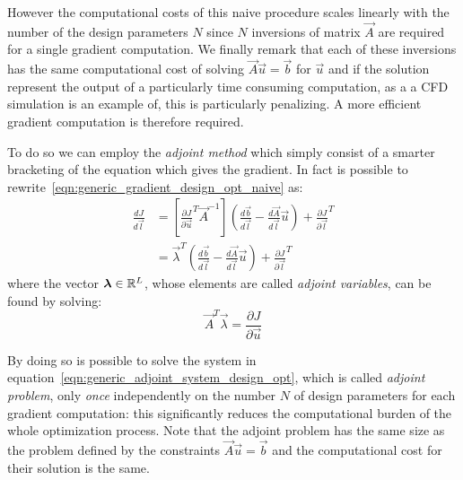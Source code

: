 However the computational costs of this naive procedure scales linearly with the number of the design parameters $N$ since $N$ inversions of matrix $\vec{A}$ are required for a single gradient computation. We finally remark that each of these inversions has the same computational cost of solving $\vec{A} \vec{u}= \vec{b}$ for $\vec{u}$ and if the solution represent the output of a particularly time consuming computation, as a a CFD simulation is an example of, this is particularly penalizing. A more efficient gradient computation is therefore required.

To do so we can employ the \emph{adjoint method} which simply consist of a smarter bracketing of the equation which gives the gradient. In fact is possible to rewrite~\eqref{eqn:generic_gradient_design_opt_naive} as:
\begin{equation}
	\begin{aligned}
		\frac{dJ}{d\vec{l}} & = \left[ \frac{\partial J}{\partial \vec{u}}^T \vec{A}^{-1} \right] \left( \frac{d\vec{b}}{d\vec{l}} - \frac{d\vec{A}}{d\vec{l}}\vec{u} \right) + \frac{\partial J}{\partial \vec{l}}^T  \\
							& = \vec{\lambda}^T \left( \frac{d\vec{b}}{d\vec{l}} - \frac{d\vec{A}}{d\vec{l}}\vec{u} \right) + \frac{\partial J}{\partial \vec{l}}^T
	\end{aligned}
\end{equation}
where the vector $\boldsymbol{\lambda} \in \mathbb{R}^L$, whose elements are called \emph{adjoint variables}, can be found by solving:
\begin{equation}
	\label{eqn:generic_adjoint_system_design_opt}
	\vec{A}^T \vec{\lambda} = \frac{\partial J}{\partial \vec{u}}
\end{equation}

By doing so is possible to solve the system in equation~\eqref{eqn:generic_adjoint_system_design_opt}, which is called \emph{adjoint problem}, only \emph{once} independently on the number $N$ of design parameters for each gradient computation: this significantly reduces the computational burden of the whole optimization process. Note that the adjoint problem has the same size as the problem defined by the constraints $\vec{A} \vec{u} = \vec{b}$ and the computational cost for their solution is the same.

